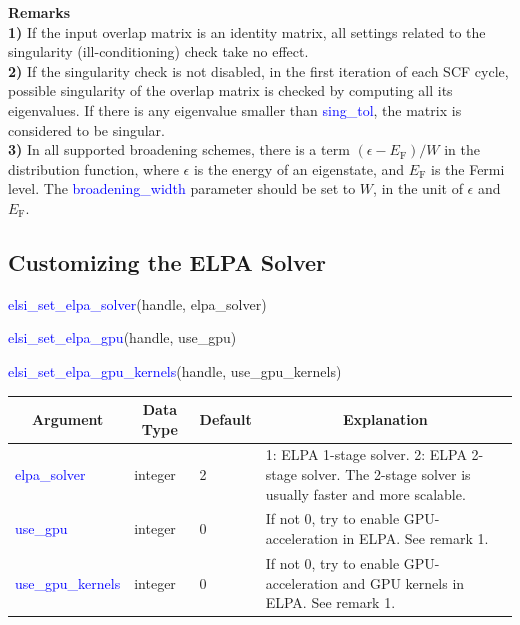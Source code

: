 \documentclass{report}
\begin{document}
\bigskip
\textbf{Remarks}\\

\textbf{1)} If the input overlap matrix is an identity matrix, all settings related to the singularity (ill-conditioning) check take no effect.\\

\textbf{2)} If the singularity check is not disabled, in the first iteration of each SCF cycle, possible singularity of the overlap matrix is checked by computing all its eigenvalues.  If there is any eigenvalue smaller than \textcolor{blue}{sing\_tol}, the matrix is considered to be singular.\\

\textbf{3)} In all supported broadening schemes, there is a term $(\epsilon - E_\text{F})/W$ in the distribution function, where $\epsilon$ is the energy of an eigenstate, and $E_\text{F}$ is the Fermi level.  The \textcolor{blue}{broadening\_width} parameter should be set to $W$, in the unit of $\epsilon$ and $E_\text{F}$.\\

\subsection{Customizing the ELPA Solver}
\label{subsec:setter_elpa}
\begin{labeling}{\hspace{6cm}}
\item [\hspace{0.3cm} \textcolor{blue}{elsi\_set\_elpa\_solver}(handle, elpa\_solver)]
\item [\hspace{0.3cm} \textcolor{blue}{elsi\_set\_elpa\_gpu}(handle, use\_gpu)]
\item [\hspace{0.3cm} \textcolor{blue}{elsi\_set\_elpa\_gpu\_kernels}(handle, use\_gpu\_kernels)]
\end{labeling}

\begin{tabular}[]{|p{30mm}|p{20mm}|p{15mm}|p{100mm}|}
\hline
\multicolumn{1}{|c|}{\textbf{Argument}} & \multicolumn{1}{c|}{\textbf{Data Type}} & \multicolumn{1}{c|}{\textbf{Default}} & \multicolumn{1}{c|}{\textbf{Explanation}}\\
\hline
\textcolor{blue}{elpa\_solver}      & integer & 2 & 1:  ELPA 1-stage solver.  2:  ELPA 2-stage solver.  The 2-stage solver is usually faster and more scalable.\\
\hline
\textcolor{blue}{use\_gpu}          & integer & 0 & If not 0, try to enable GPU-acceleration in ELPA.  See remark 1.\\
\hline
\textcolor{blue}{use\_gpu\_kernels} & integer & 0 & If not 0, try to enable GPU-acceleration and GPU kernels in ELPA.  See remark 1.\\
\hline
\end{tabular}
\end{document}
